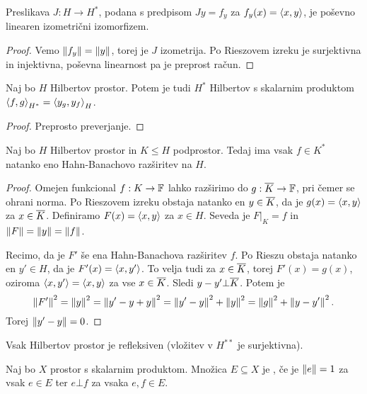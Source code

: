 \begin{trditev}
  Preslikava $J: H \to H^*$, podana s predpisom $Jy = f_y$ za $f_y(x) =
  \left< x,y \right>$, je poševno linearen izometrični izomorfizem.
\end{trditev}

\begin{proof}
  Vemo $\left\lVert f_y\right\rVert = \left\lVert y\right\rVert$, torej je $J$ izometrija.
  Po Rieszovem izreku je surjektivna in injektivna, poševna linearnost pa je
  preprost račun.
\end{proof}

\begin{izrek}
  Naj bo $H$ Hilbertov prostor.
  Potem je tudi $H^*$ Hilbertov s skalarnim produktom $\left< f,g \right>_{H^*} = \left< y_g,
  y_f \right>_H$.
\end{izrek}

\begin{proof}
  Preprosto preverjanje.
\end{proof}

\begin{izrek}
  Naj bo $H$ Hilbertov prostor in $K \le H$ podprostor.
  Tedaj ima vsak $f \in K^*$ natanko eno Hahn-Banachovo razširitev na $H$.
\end{izrek}

\begin{proof}
  Omejen funkcional $f: K \to \mathbb{F}$ lahko razširimo do $g: \overline{K} \to \mathbb{F}$, pri
  čemer se ohrani norma.
  Po Rieszovem izreku obstaja natanko en $y \in \overline{K}$, da je $g(x) =
  \left< x,y \right>$ za $x \in \overline{K}$.
  Definiramo $F(x) = \left< x,y \right>$ za $x \in H$.
  Seveda je $\left. F \right|_K = f$ in $\left\lVert F\right\rVert = \left\lVert y\right\rVert = \left\lVert f\right\rVert$.

  Recimo, da je $F'$ še ena Hahn-Banachova razširitev $f$.
  Po Rieszu obstaja natanko en $y' \in H$, da je $F'(x) = \left< x,y' \right>$.
  To velja tudi za $x \in \overline{K}$, torej $F'(x) = g(x)$,
  oziroma $\left< x,y' \right> = \left< x,y \right>$ za vse $x \in \overline{K}$.
  Sledi $y-y' \bot \overline{K}$.
  Potem je
  \[
	\left\lVert F'\right\rVert^2 = \left\lVert y\right\rVert^2 = \left\lVert y' - y + y\right\rVert^2
	= \left\lVert y' - y\right\rVert^2 + \left\lVert y\right\rVert^2 = \left\lVert g\right\rVert^2 + \left\lVert y - y'\right\rVert^2.
  \]
  Torej $\left\lVert y'-y\right\rVert = 0$.
\end{proof}

\begin{posledica}
  Vsak Hilbertov prostor je refleksiven (vložitev v $H^{**}$ je surjektivna).
\end{posledica}


\begin{definicija}
  Naj bo $X$ prostor s skalarnim produktom.
  Množica $E \subseteq X$ je , če je $\left\lVert e\right\rVert = 1$
  za vsak $e \in E$ ter $e \bot f$ za vsaka $e,f \in E$.
\end{definicija}

